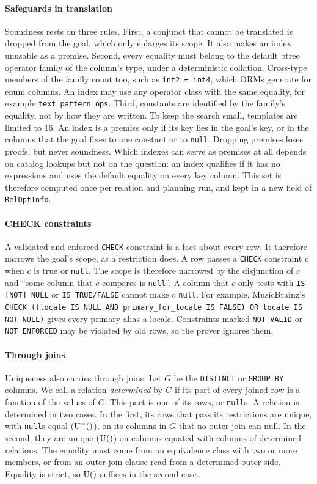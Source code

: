 \documentclass[conference]{IEEEtran}
\theoremstyle{definition}
\newcommand{\sql}[1]{\texttt{#1}}
\newcommand{\nul}{\texttt{null}}
\newcommand{\U}[1]{\mathrm{U}(#1)}
\newcommand{\Ueq}[1]{\mathrm{U}^{=}(#1)}
\begin{document}
\paragraph*{Safeguards in translation} Soundness rests on three rules. First, a conjunct that cannot be translated is
dropped from the goal, which only enlarges its scope. It also makes an index unusable as a premise. Second, every
equality must belong to the default btree operator family of the column's type, under a deterministic collation.
Cross-type members of the family count too, such as \sql{int2 = int4}, which ORMs generate for enum columns. An index may
use any operator class with the same equality, for example \sql{text\_pattern\_ops}. Third, constants are identified by
the family's equality, not by how they are written. To keep the search small, templates are limited to 16. An index is a
premise only if its key lies in the goal's key, or in the columns that the goal fixes to one constant or to \nul. Dropping
premises loses proofs, but never soundness. Which indexes can serve as premises at all depends on catalog lookups but not
on the question: an index qualifies if it has no expressions and uses the default equality on every key column. This set
is therefore computed once per relation and planning run, and kept in a new field of \sql{RelOptInfo}.

\paragraph*{CHECK constraints} A validated and enforced \sql{CHECK} constraint is a fact about every row. It
therefore narrows the goal's scope, as a restriction does. A row passes a \sql{CHECK} constraint $c$ when $c$ is true or \nul.
The scope is therefore narrowed by the disjunction of $c$ and ``some column that $c$ compares is \nul''. A column that $c$ only tests with
\sql{IS [NOT] NULL} or \sql{IS TRUE/FALSE} cannot make $c$ \nul. For example, MusicBrainz's \sql{CHECK ((locale IS NULL
AND primary\_for\_locale IS FALSE) OR locale IS NOT NULL)} gives every primary alias a locale. Constraints marked
\sql{NOT VALID} or \sql{NOT ENFORCED} may be violated by old rows, so the prover ignores them.

\paragraph*{Through joins} Uniqueness also carries through joins. Let $G$ be the \sql{DISTINCT} or \sql{GROUP BY}
columns. We call a relation \emph{determined} by $G$ if its part of every joined row is a function of the values of $G$.
This part is one of its rows, or \nul s. A relation is determined in two cases. In the first, its rows that
pass its restrictions are unique, with \nul s equal ($\Ueq$), on its columns in $G$ that no outer join can null. In the
second, they are unique ($\U$) on columns equated with columns of determined relations. The equality must come from an
equivalence class with two or more members, or from an outer join clause read from a determined outer side. Equality is
strict, so $\U$ suffices in the second case.
\end{document}
